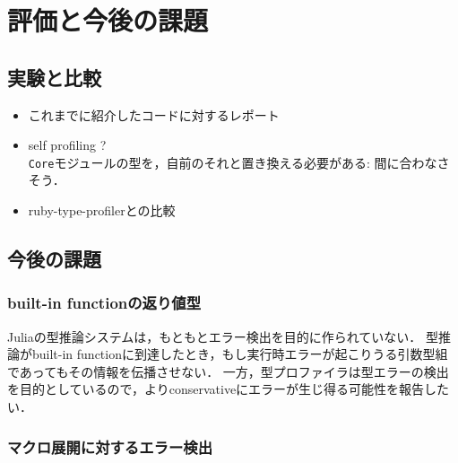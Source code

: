 
\section{評価と今後の課題} \label{section:4}

\subsection{実験と比較}

\begin{itemize}
  \item これまでに紹介したコードに対するレポート
  \item self profiling ?\\
        \verb|Core|モジュールの型を，自前のそれと置き換える必要がある: 間に合わなさそう．
  \item ruby-type-profilerとの比較
\end{itemize}

\subsection{今後の課題}

\subsubsection{built-in functionの返り値型}

Juliaの型推論システムは，もともとエラー検出を目的に作られていない．
型推論がbuilt-in functionに到達したとき，もし実行時エラーが起こりうる引数型組であってもその情報を伝播させない．
一方，型プロファイラは型エラーの検出を目的としているので，よりconservativeにエラーが生じ得る可能性を報告したい．

\subsubsection{マクロ展開に対するエラー検出}

